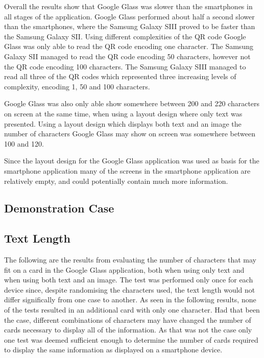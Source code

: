 Overall the results show that Google Glass was slower than the smartphones in all stages of the application. Google Glass performed about half a second slower than the smartphones, where the Samsung Galaxy SIII proved to be faster than the Samsung Galaxy SII. Using different complexities of the QR code Google Glass was only able to read the QR code encoding one character. The Samsung Galaxy SII managed to read the QR code encoding 50 characters, however not the QR code encoding 100 characters. The Samsung Galaxy SIII managed to read all three of the QR codes which represented three increasing levels of complexity, encoding 1, 50 and 100 characters.

Google Glass was also only able show somewhere between 200 and 220 characters on screen at the same time, when using a layout design where only text was presented. Using a layout design which displays both text and an image the number of characters Google Glass may show on screen was somewhere between 100 and 120.

Since the layout design for the Google Glass application was used as basis for the smartphone application many of the screens in the smartphone application are relatively empty, and could potentially contain much more information.

\subsection{Demonstration Case}



\subsection{Text Length}
The following are the results from evaluating the number of characters that may fit on a card in the Google Glass application, both when using only text and when using both text and an image. The test was performed only once for each device since, despite randomising the characters used, the text length would not differ significally from one case to another. As seen in the following results, none of the tests resulted in an additional card with only one character. Had that been the case, different combinations of characters may have changed the number of cards necessary to display all of the information. As that was not the case only one test was deemed sufficient enough to determine the number of cards required to display the same information as displayed on a smartphone device.

